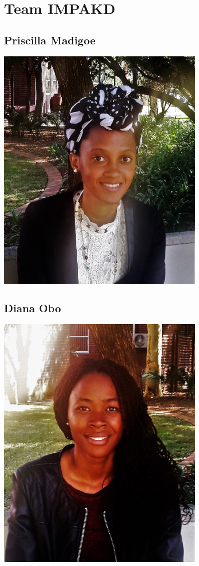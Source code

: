 \documentclass[a4paper,12pt]{article}
\begin{document}
\newpage
\section{Team IMPAKD}
\subsection{Priscilla Madigoe}
\includegraphics[width=4in]{P.jpg}\\[0.4cm] 
\subsection{Diana Obo}
\includegraphics[width=4in]{Diana.jpg}\\[0.4cm] 
\end{document}
